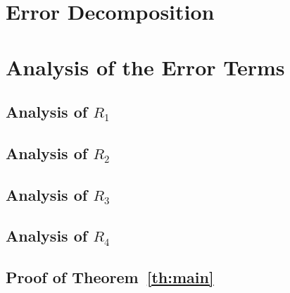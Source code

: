 \section{Error Decomposition}
  
\section{Analysis of the Error Terms}
  \subsection{Analysis of $R_1$}
    
  \subsection{Analysis of $R_2$}
    
  \subsection{Analysis of $R_3$}
    
    \newpage
  \subsection{Analysis of $R_4$}
    
  \subsection{Proof of Theorem~\ref{th:main}}
    
